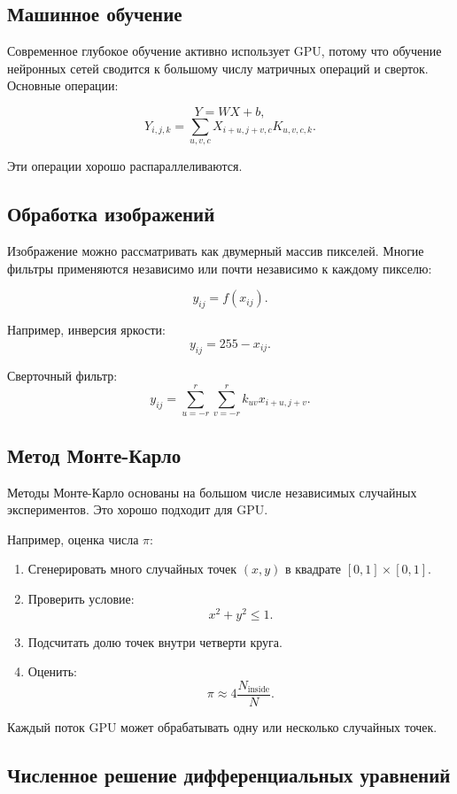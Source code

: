 \documentclass[12pt,a4paper]{article}
\begin{document}
\subsection{Машинное обучение}

Современное глубокое обучение активно использует GPU, потому что обучение нейронных сетей сводится к большому числу матричных операций и сверток. Основные операции:

\[
    Y = WX + b,
\]
\[
    Y_{i,j,k} = \sum_{u,v,c} X_{i+u,j+v,c}K_{u,v,c,k}.
\]

Эти операции хорошо распараллеливаются.

\subsection{Обработка изображений}

Изображение можно рассматривать как двумерный массив пикселей. Многие фильтры применяются независимо или почти независимо к каждому пикселю:

\[
    y_{ij} = f(x_{ij}).
\]

Например, инверсия яркости:
\[
    y_{ij} = 255 - x_{ij}.
\]

Сверточный фильтр:
\[
    y_{ij} = \sum_{u=-r}^{r}\sum_{v=-r}^{r} k_{uv}x_{i+u,j+v}.
\]

\subsection{Метод Монте-Карло}

Методы Монте-Карло основаны на большом числе независимых случайных экспериментов. Это хорошо подходит для GPU.

Например, оценка числа $\pi$:

\begin{enumerate}
    \item Сгенерировать много случайных точек $(x,y)$ в квадрате $[0,1]\times[0,1]$.
    \item Проверить условие:
    \[
        x^2+y^2 \le 1.
    \]
    \item Подсчитать долю точек внутри четверти круга.
    \item Оценить:
    \[
        \pi \approx 4\frac{N_{\text{inside}}}{N}.
    \]
\end{enumerate}

Каждый поток GPU может обрабатывать одну или несколько случайных точек.

\subsection{Численное решение дифференциальных уравнений}
\end{document}
